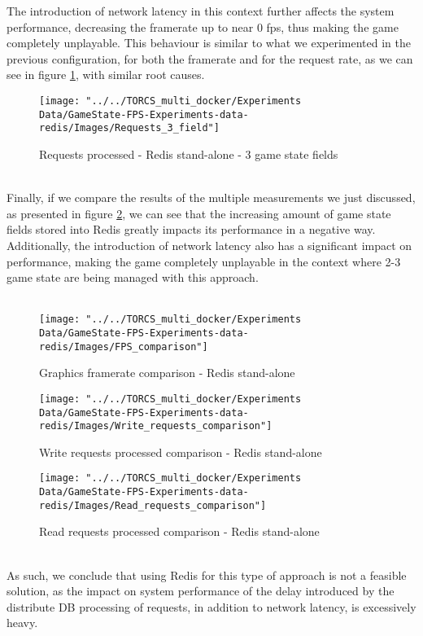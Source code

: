 The introduction of network latency in this context further affects the system performance, decreasing the framerate up to near 0 fps, thus making the game completely unplayable. This behaviour is similar to what we experimented in the previous configuration, for both the framerate and for the request rate, as we can see in figure \ref{fig:requests-3-field-redis}, with similar root causes. \\
\begin{figure}[h!]
	\centering
	\texttt{[image: "../../TORCS\_multi\_docker/Experiments Data/GameState-FPS-Experiments-data-redis/Images/Requests\_3\_field"]}
	\caption[Requests processed - Redis stand-alone - 3 game state fields]{Requests processed - Redis stand-alone - 3 game state fields}
	\label{fig:requests-3-field-redis}
\end{figure}
\pagebreak
\\ Finally, if we compare the results of the multiple measurements we just discussed, as presented in figure \ref{fig:fps-comparison-redis}, we can see that the increasing amount of game state fields stored into Redis greatly impacts its performance in a negative way. \\
Additionally, the introduction of network latency also has a significant impact on performance, making the game completely unplayable in the context where 2-3 game state are being managed with this approach. \\ \\
\begin{figure}[h!]
	\centering
	\texttt{[image: "../../TORCS\_multi\_docker/Experiments Data/GameState-FPS-Experiments-data-redis/Images/FPS\_comparison"]}
	\caption[Graphics framerate comparison - Redis stand-alone]{Graphics framerate comparison - Redis stand-alone}
	\label{fig:fps-comparison-redis}
\end{figure}
\begin{figure}[h!]
	\centering
	\texttt{[image: "../../TORCS\_multi\_docker/Experiments Data/GameState-FPS-Experiments-data-redis/Images/Write\_requests\_comparison"]}
	\caption[Write requests processed comparison - Redis stand-alone]{Write requests processed comparison - Redis stand-alone}
	\label{fig:write-requests-comparison-redis}
\end{figure}
\begin{figure}[h!]
	\centering
	\texttt{[image: "../../TORCS\_multi\_docker/Experiments Data/GameState-FPS-Experiments-data-redis/Images/Read\_requests\_comparison"]}
	\caption[Read requests processed comparison - Redis stand-alone]{Read requests processed comparison - Redis stand-alone}
	\label{fig:read-requests-comparison-redis}
\end{figure}
\\ As such, we conclude that using Redis for this type of approach is not a feasible solution, as the impact on system performance of the delay introduced by the distribute DB processing of requests, in addition to network latency, is excessively heavy.

